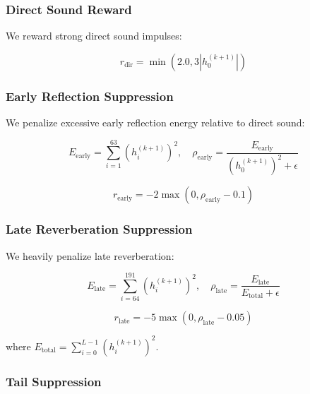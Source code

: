 \subsubsection{Direct Sound Reward}

We reward strong direct sound impulses:

\begin{equation}
r_\text{dir} = \min(2.0, 3 |h_0^{(k+1)}|)
\label{eq:direct_reward}
\end{equation}

\subsubsection{Early Reflection Suppression}

We penalize excessive early reflection energy relative to direct sound:

\begin{equation}
E_\text{early} = \sum_{i=1}^{63} (h_i^{(k+1)})^2, \quad \rho_\text{early} = \frac{E_\text{early}}{(h_0^{(k+1)})^2 + \epsilon}
\label{eq:early_energy}
\end{equation}

\begin{equation}
r_\text{early} = -2 \max(0, \rho_\text{early} - 0.1)
\label{eq:early_reward}
\end{equation}

\subsubsection{Late Reverberation Suppression}

We heavily penalize late reverberation:

\begin{equation}
E_\text{late} = \sum_{i=64}^{191} (h_i^{(k+1)})^2, \quad \rho_\text{late} = \frac{E_\text{late}}{E_\text{total} + \epsilon}
\label{eq:late_energy}
\end{equation}

\begin{equation}
r_\text{late} = -5 \max(0, \rho_\text{late} - 0.05)
\label{eq:late_reward}
\end{equation}

\noindent where $E_\text{total} = \sum_{i=0}^{L-1} (h_i^{(k+1)})^2$.

\subsubsection{Tail Suppression}

